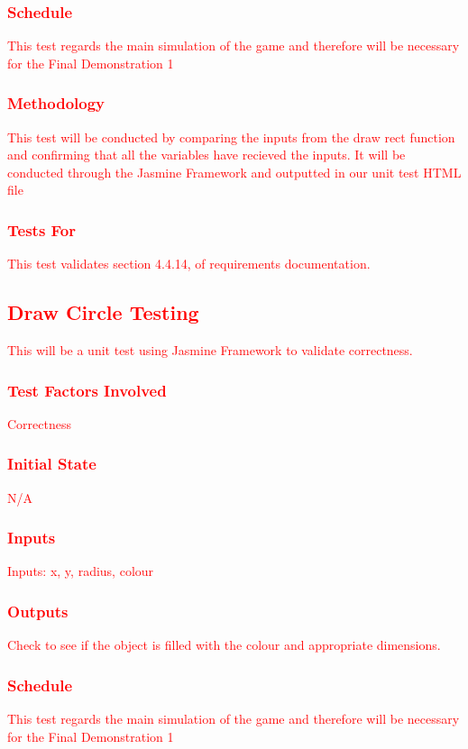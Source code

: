 \documentclass[11pt, oneside]{article}   	%
\begin{document}
\subsubsection{\textcolor{red}{Schedule}}
\textcolor{red}{This test regards the main simulation of the game and therefore will be necessary for the Final Demonstration 1}
\subsubsection{\textcolor{red}{Methodology}}
\textcolor{red}{This test will be conducted by comparing the inputs from the draw rect function and confirming that all the variables have recieved the inputs. It will be conducted through the Jasmine Framework and outputted in our unit test HTML file}
\subsubsection{\textcolor{red}{Tests For}}
\textcolor{red}{This test validates section 4.4.14, of requirements documentation.}



\subsection{\textcolor{red}{Draw Circle Testing}}
\textcolor{red}{This will be a unit test using Jasmine Framework to validate correctness.}
\subsubsection{\textcolor{red}{Test Factors Involved}}
\textcolor{red}{Correctness}
\subsubsection{\textcolor{red}{Initial State}}
\textcolor{red}{N/A}
\subsubsection{\textcolor{red}{Inputs}}
\textcolor{red}{Inputs: x, y, radius, colour}
\subsubsection{\textcolor{red}{Outputs}}
\textcolor{red}{Check to see if the object is filled with the colour and appropriate dimensions.}
\subsubsection{\textcolor{red}{Schedule}}
\textcolor{red}{This test regards the main simulation of the game and therefore will be necessary for the Final Demonstration 1}
\end{document}
